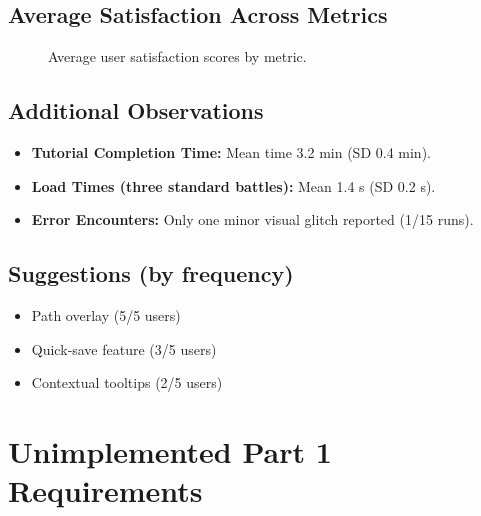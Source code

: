 \documentclass[11pt,a4paper]{article}
\begin{document}
\subsection*{Average Satisfaction Across Metrics}
\begin{figure}[h]
  \centering
  \caption{Average user satisfaction scores by metric.}
\end{figure}

\subsection*{Additional Observations}
\begin{itemize}[nosep]
  \item \textbf{Tutorial Completion Time:}  
    Mean time 3.2 min (SD 0.4 min).
  \item \textbf{Load Times (three standard battles):}  
    Mean 1.4 s (SD 0.2 s).
  \item \textbf{Error Encounters:}  
    Only one minor visual glitch reported (1/15 runs).
\end{itemize}

\subsection*{Suggestions (by frequency)}
\begin{itemize}[nosep]
  \item Path overlay (5/5 users)  
  \item Quick‐save feature (3/5 users)  
  \item Contextual tooltips (2/5 users)  
\end{itemize}

\section{Unimplemented Part 1 Requirements}
\end{document}

